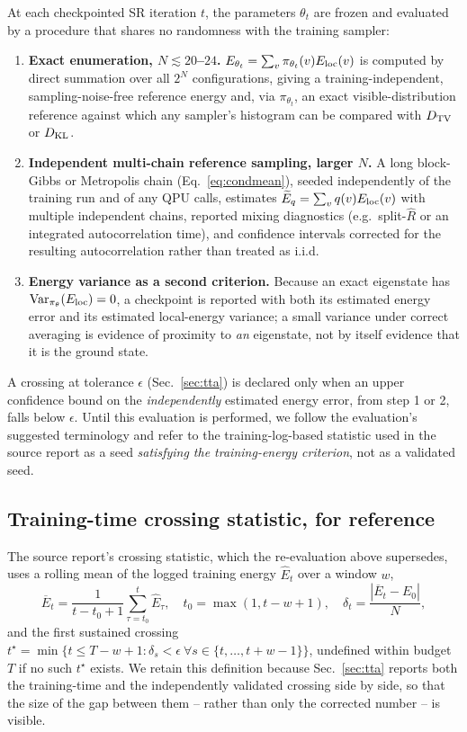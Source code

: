 At each checkpointed SR iteration $t$, the parameters $\theta_t$ are frozen and evaluated by a procedure that shares no randomness with the training sampler:
\begin{enumerate}
\item \textbf{Exact enumeration, $N\lesssim20$--$24$.} $E_{\theta_t}=\sum_v\pi_{\theta_t}(v)E_{\mathrm{loc}}(v)$ is computed by direct summation over all $2^N$ configurations, giving a training-independent, sampling-noise-free reference energy and, via $\pi_{\theta_t}$, an exact visible-distribution reference against which any sampler's histogram can be compared with $D_{\mathrm{TV}}$ or $D_{\mathrm{KL}}$.
\item \textbf{Independent multi-chain reference sampling, larger $N$.} A long block-Gibbs or Metropolis chain (Eq.~\eqref{eq:condmean}), seeded independently of the training run and of any QPU calls, estimates $\widetilde E_q=\sum_vq(v)E_{\mathrm{loc}}(v)$ with multiple independent chains, reported mixing diagnostics (e.g.\ split-$\hat R$ or an integrated autocorrelation time), and confidence intervals corrected for the resulting autocorrelation rather than treated as i.i.d.
\item \textbf{Energy variance as a second criterion.} Because an exact eigenstate has $\operatorname{Var}_{\pi_\theta}(E_{\mathrm{loc}})=0$, a checkpoint is reported with both its estimated energy error and its estimated local-energy variance; a small variance under correct averaging is evidence of proximity to \emph{an} eigenstate, not by itself evidence that it is the ground state.
\end{enumerate}
A crossing at tolerance $\epsilon$ (Sec.~\ref{sec:tta}) is declared only when an upper confidence bound on the \emph{independently} estimated energy error, from step 1 or 2, falls below $\epsilon$. Until this evaluation is performed, we follow the evaluation's suggested terminology and refer to the training-log-based statistic used in the source report as a seed \emph{satisfying the training-energy criterion}, not as a validated seed.

\subsection{Training-time crossing statistic, for reference}
\label{sec:trainingcrossing}

The source report's crossing statistic, which the re-evaluation above supersedes, uses a rolling mean of the logged training energy $\widehat E_t$ over a window $w$,
\begin{equation}
\overline E_t=\frac1{t-t_0+1}\sum_{\tau=t_0}^t\widehat E_\tau,\quad t_0=\max(1,t-w+1),\quad \delta_t=\frac{|\overline E_t-E_0|}{N},
\label{eq:rollingmean}
\end{equation}
and the first sustained crossing $t^\star=\min\{t\le T-w+1:\delta_s<\epsilon\ \forall s\in\{t,\dots,t+w-1\}\}$, undefined within budget $T$ if no such $t^\star$ exists. We retain this definition because Sec.~\ref{sec:tta} reports both the training-time and the independently validated crossing side by side, so that the size of the gap between them -- rather than only the corrected number -- is visible.

